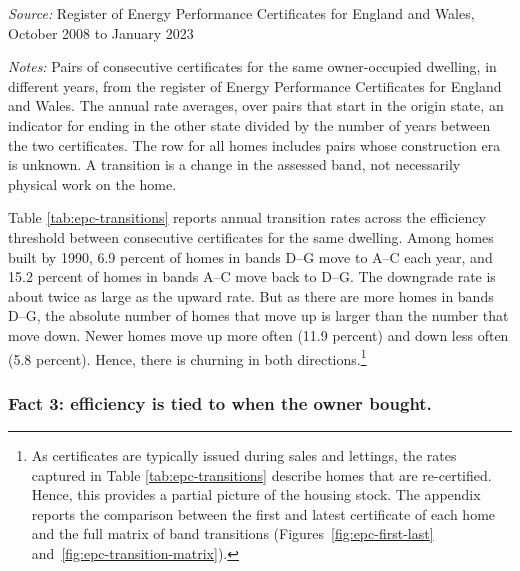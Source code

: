 \begin{table}[t]
  \centering
  \caption{Transitions across the efficiency threshold between EPC
    certificates, owner-occupied homes}\label{tab:epc-transitions}
  \begin{threeparttable}
    \begin{tablenotes}[flushleft]\footnotesize
      \item \textit{Source:} Register of Energy Performance Certificates for England and Wales, October 2008 to January 2023
      \item \textit{Notes:} Pairs of consecutive certificates for the same
      owner-occupied dwelling, in different years, from the register of
      Energy Performance Certificates for England and Wales. The annual rate
      averages, over pairs that start in the origin state, an indicator for
      ending in the other state divided by the number of years between the
      two certificates. The row for all homes includes pairs whose
      construction era is unknown. A transition is a change in the assessed
      band, not necessarily physical work on the home.
    \end{tablenotes}
  \end{threeparttable}
\end{table}


Table \ref{tab:epc-transitions} reports annual transition rates across the
efficiency threshold between consecutive certificates for the same dwelling. Among homes built by 1990, 6.9 percent of homes in
bands D--G move to A--C each year, and 15.2 percent of homes in bands A--C
move back to D--G. The downgrade rate is about twice as large as the upward rate. But as there are more homes in bands D--G, the absolute number of homes that move up is larger than the number that move down. Newer homes move up more often (11.9 percent) and down
less often (5.8 percent). Hence, there is churning in both directions.\footnote{As certificates are typically issued during sales and lettings, the
  rates captured in Table \ref{tab:epc-transitions} describe homes that are re-certified. Hence, this provides a partial picture of the housing stock.  The appendix reports the comparison between the first and latest certificate of each home and the full matrix of band transitions (Figures~\ref{fig:epc-first-last}
  and~\ref{fig:epc-transition-matrix}).}

\subsubsection{Fact 3: efficiency is tied to when the owner bought.}

